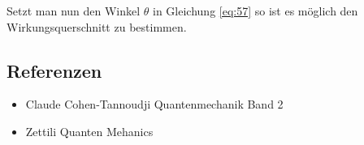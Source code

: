 Setzt man nun den Winkel \(\theta\) in Gleichung \eqref{eq:57} so ist es möglich den Wirkungsquerschnitt zu bestimmen.





\subsection*{Referenzen}
\begin{itemize}
\item Claude Cohen-Tannoudji Quantenmechanik Band 2
\item Zettili Quanten Mehanics
\end{itemize}


